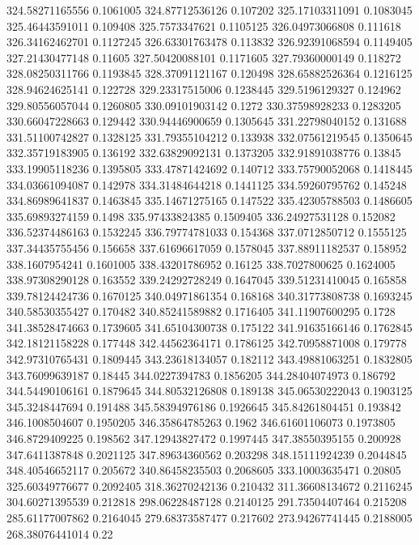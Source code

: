 324.58271165556 0.1061005
324.87712536126 0.107202
325.17103311091 0.1083045
325.46443591011 0.109408
325.7573347621 0.1105125
326.04973066808 0.111618
326.34162462701 0.1127245
326.63301763478 0.113832
326.92391068594 0.1149405
327.21430477148 0.11605
327.50420088101 0.1171605
327.79360000149 0.118272
328.08250311766 0.1193845
328.37091121167 0.120498
328.65882526364 0.1216125
328.94624625141 0.122728
329.23317515006 0.1238445
329.5196129327 0.124962
329.80556057044 0.1260805
330.09101903142 0.1272
330.37598928233 0.1283205
330.66047228663 0.129442
330.94446900659 0.1305645
331.22798040152 0.131688
331.51100742827 0.1328125
331.79355104212 0.133938
332.07561219545 0.1350645
332.35719183905 0.136192
332.63829092131 0.1373205
332.91891038776 0.13845
333.19905118236 0.1395805
333.47871424692 0.140712
333.75790052068 0.1418445
334.03661094087 0.142978
334.31484644218 0.1441125
334.59260795762 0.145248
334.86989641837 0.1463845
335.14671275165 0.147522
335.42305788503 0.1486605
335.69893274159 0.1498
335.97433824385 0.1509405
336.24927531128 0.152082
336.52374486163 0.1532245
336.79774781033 0.154368
337.0712850712 0.1555125
337.34435755456 0.156658
337.61696617059 0.1578045
337.88911182537 0.158952
338.1607954241 0.1601005
338.43201786952 0.16125
338.7027800625 0.1624005
338.97308290128 0.163552
339.24292728249 0.1647045
339.51231410045 0.165858
339.78124424736 0.1670125
340.04971861354 0.168168
340.31773808738 0.1693245
340.58530355427 0.170482
340.85241589882 0.1716405
341.11907600295 0.1728
341.38528474663 0.1739605
341.65104300738 0.175122
341.91635166146 0.1762845
342.18121158228 0.177448
342.44562364171 0.1786125
342.70958871008 0.179778
342.97310765431 0.1809445
343.23618134057 0.182112
343.49881063251 0.1832805
343.76099639187 0.18445
344.0227394783 0.1856205
344.28404074973 0.186792
344.54490106161 0.1879645
344.80532126808 0.189138
345.06530222043 0.1903125
345.3248447694 0.191488
345.58394976186 0.1926645
345.84261804451 0.193842
346.1008504607 0.1950205
346.35864785263 0.1962
346.61601106073 0.1973805
346.8729409225 0.198562
347.12943827472 0.1997445
347.38550395155 0.200928
347.6411387848 0.2021125
347.89634360562 0.203298
348.15111924239 0.2044845
348.40546652117 0.205672
340.86458235503 0.2068605
333.10003635471 0.20805
325.60349776677 0.2092405
318.36270242136 0.210432
311.36608134672 0.2116245
304.60271395539 0.212818
298.06228487128 0.2140125
291.73504407464 0.215208
285.61177007862 0.2164045
279.68373587477 0.217602
273.94267741445 0.2188005
268.38076441014 0.22
